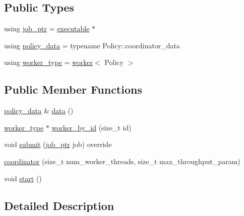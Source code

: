 \subsection*{Public Types}
\begin{DoxyCompactItemize}
\item 
using \hyperlink{classactor__zeta_1_1executor_1_1coordinator_a6104368cc7f2de545e7c242eda00fcf7}{job\+\_\+ptr} = \hyperlink{structactor__zeta_1_1executor_1_1executable}{executable} $\ast$
\item 
using \hyperlink{classactor__zeta_1_1executor_1_1coordinator_a81ac6921473ebffdc2a20df32249dbcc}{policy\+\_\+data} = typename Policy\+::coordinator\+\_\+data
\item 
using \hyperlink{classactor__zeta_1_1executor_1_1coordinator_a97ba3b1f4578cf25c7311e177edf8c59}{worker\+\_\+type} = \hyperlink{classactor__zeta_1_1executor_1_1worker}{worker}$<$ Policy $>$
\end{DoxyCompactItemize}
\subsection*{Public Member Functions}
\begin{DoxyCompactItemize}
\item 
\hyperlink{classactor__zeta_1_1executor_1_1coordinator_a81ac6921473ebffdc2a20df32249dbcc}{policy\+\_\+data} \& \hyperlink{classactor__zeta_1_1executor_1_1coordinator_a2e94e1b65d78e6c0b0e2861c9b679ddf}{data} ()
\item 
\hyperlink{classactor__zeta_1_1executor_1_1coordinator_a97ba3b1f4578cf25c7311e177edf8c59}{worker\+\_\+type} $\ast$ \hyperlink{classactor__zeta_1_1executor_1_1coordinator_aa008bba1c4e8d94467e79465f978e95b}{worker\+\_\+by\+\_\+id} (size\+\_\+t id)
\item 
void \hyperlink{classactor__zeta_1_1executor_1_1coordinator_a522583023fb9e0c774ca101a09b938f1}{submit} (\hyperlink{classactor__zeta_1_1executor_1_1coordinator_a6104368cc7f2de545e7c242eda00fcf7}{job\+\_\+ptr} job) override
\item 
\hyperlink{classactor__zeta_1_1executor_1_1coordinator_a8775cdb668847488833bf434433971bd}{coordinator} (size\+\_\+t num\+\_\+worker\+\_\+threads, size\+\_\+t max\+\_\+throughput\+\_\+param)
\item 
void \hyperlink{classactor__zeta_1_1executor_1_1coordinator_a1b73b7ddd6b48ba3e15b6f710cb21808}{start} ()
\end{DoxyCompactItemize}


\subsection{Detailed Description}
